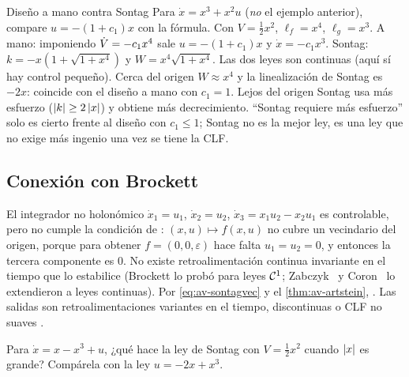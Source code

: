 
\begin{ejemplo}[label=ej:av-mano]{Diseño a mano contra Sontag}
Para $\dot x=x^3+x^2u$ (\emph{no} el ejemplo anterior), compare $u=-(1+c_1)x$ con la fórmula.
\solucion Con $V=\tfrac12x^2$, $\ell_f=x^4$, $\ell_g=x^3$. A mano: imponiendo $\dot V=-c_1x^4$ sale $u=-(1+c_1)x$ y $\dot x=-c_1x^3$. Sontag: $k=-x(1+\sqrt{1+x^4})$ y $W=x^4\sqrt{1+x^4}$. Las dos leyes son continuas (aquí sí hay control pequeño). Cerca del origen $W\approx x^4$ y la linealización de Sontag es $-2x$: coincide con el diseño a mano con $c_1=1$. Lejos del origen Sontag usa más esfuerzo ($\left\lvert k\right\rvert\ge2\left\lvert x\right\rvert$) y obtiene más decrecimiento. ``Sontag requiere más esfuerzo'' solo es cierto frente al diseño con $c_1\le1$; Sontag no es la mejor ley, es una ley que no exige más ingenio una vez se tiene la CLF.
\end{ejemplo}

\subsection{Conexión con Brockett}

El integrador no holonómico $\dot x_1=u_1$, $\dot x_2=u_2$, $\dot x_3=x_1u_2-x_2u_1$ es controlable, pero no cumple la condición de \citet{Bro83}: $(x,u)\mapsto f(x,u)$ no cubre un vecindario del origen, porque para obtener $f=(0,0,\varepsilon)$ hace falta $u_1=u_2=0$, y entonces la tercera componente es $0$. No existe retroalimentación continua invariante en el tiempo que lo estabilice (Brockett lo probó para leyes $\mathcal{C}^{1}$; Zabczyk~\citep{Zab89} y Coron~\citep{Cor90} lo extendieron a leyes continuas). Por \eqref{eq:av-sontagvec} y el \cref{thm:av-artstein}, . Las salidas son retroalimentaciones variantes en el tiempo, discontinuas o CLF no suaves \citep[\S9.6]{KeBr23}.

\begin{pausa}
Para $\dot x=x-x^3+u$, ¿qué hace la ley de Sontag con $V=\tfrac12x^2$ cuando $\left\lvert x\right\rvert$ es grande? Compárela con la ley $u=-2x+x^3$.
\end{pausa}
